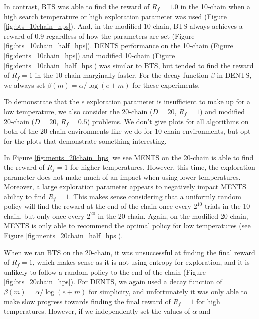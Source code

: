     In contrast, BTS was able to find the reward of $R_f=1.0$ in the 10-chain when a high search temperature or high exploration parameter was used (Figure \ref{fig:bts_10chain_hps}). And, in the modified 10-chain, BTS always achieves a reward of $0.9$ regardless of how the parameters are set (Figure \ref{fig:bts_10chain_half_hps}). DENTS performance on the 10-chain (Figure \ref{fig:dents_10chain_hps}) and modified 10-chain (Figure \ref{fig:dents_10chain_half_hps}) was similar to BTS, but tended to find the reward of $R_f=1$ in the 10-chain marginally faster. For the decay function $\beta$ in DENTS, we always set $\beta(m)=\alpha/\log(e+m)$ for these experiments.

    To demonstrate that the $\epsilon$ exploration parameter is insufficient to make up for a low temperature, we also consider the 20-chain ($D=20$, $R_f=1$) and modified 20-chain ($D=20$, $R_f=0.5$) problems. We don't give plots for all algorithms on both of the 20-chain environments like we do for 10-chain environments, but opt for the plots that demonstrate something interesting. 
    
    In Figure \ref{fig:ments_20chain_hps} we see MENTS on the 20-chain is able to find the reward of $R_f=1$ for higher temperatures. However, this time, the exploration parameter does not make much of an impact when using lower temperatures. Moreover, a large exploration parameter appears to negatively impact MENTS ability to find $R_f=1$. This makes sense considering that a uniformly random policy will find the reward at the end of the chain once every $2^{10}$ trials in the 10-chain, but only once every $2^{20}$ in the 20-chain. Again, on the modified 20-chain, MENTS is only able to recommend the optimal policy for low temperatures (see Figure \ref{fig:ments_20chain_half_hps}). 

    When we ran BTS on the 20-chain, it was unsuccessful at finding the final reward of $R_f=1$, which makes sense as it is not using entropy for exploration, and it is unlikely to follow a random policy to the end of the chain (Figure \ref{fig:bts_20chain_hps}). For DENTS, we again used a decay function of $\beta(m)=\alpha/\log(e+m)$ for simplicity, and unfortunately it was only able to make slow progress towards finding the final reward of $R_f=1$ for high temperatures. However, if we independently set the values of $\alpha$ and 
    
